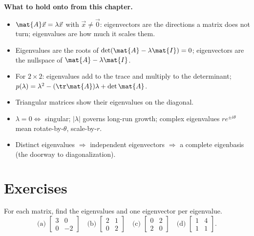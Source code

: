 \begin{focusbox}
\textbf{What to hold onto from this chapter.}
\begin{itemize}
  \item $\mat{A}\vec{x}=\lambda\vec{x}$ with $\vec{x}\neq\vec{0}$: eigenvectors are
        the directions a matrix does not turn; eigenvalues are how much it scales
        them.
  \item Eigenvalues are the roots of $\det(\mat{A}-\lambda\mat{I})=0$; eigenvectors
        are the nullspace of $\mat{A}-\lambda\mat{I}$.
  \item For $2\times 2$: eigenvalues add to the trace and multiply to the
        determinant; $p(\lambda)=\lambda^2-(\tr\mat{A})\lambda+\det\mat{A}$.
  \item Triangular matrices show their eigenvalues on the diagonal.
  \item $\lambda=0\Leftrightarrow$ singular; $|\lambda|$ governs long-run growth;
        complex eigenvalues $r e^{\pm i\theta}$ mean rotate-by-$\theta$,
        scale-by-$r$.
  \item Distinct eigenvalues $\Rightarrow$ independent eigenvectors $\Rightarrow$
        a complete eigenbasis (the doorway to diagonalization).
  \end{itemize}
\end{focusbox}

\section*{Exercises}

\begin{exercise}
\label{ch23:ex-warm}
For each matrix, find the eigenvalues and one eigenvector per eigenvalue.
\[
  \text{(a) } \begin{bmatrix}3 & 0\\ 0 & -2\end{bmatrix}\quad
  \text{(b) } \begin{bmatrix}2 & 1\\ 0 & 2\end{bmatrix}\quad
  \text{(c) } \begin{bmatrix}0 & 2\\ 2 & 0\end{bmatrix}\quad
  \text{(d) } \begin{bmatrix}1 & 4\\ 1 & 1\end{bmatrix}.
\]
\end{exercise}

